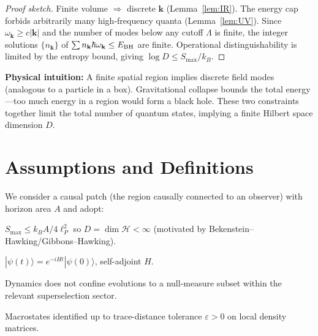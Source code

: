 \documentclass[12pt]{article}
\theoremstyle{remark}
\begin{document}
\begin{proof}[Proof sketch]
Finite volume $\Rightarrow$ discrete $\mathbf{k}$ (Lemma~\ref{lem:IR}). The energy cap forbids arbitrarily many high-frequency quanta (Lemma~\ref{lem:UV}). 
Since $\omega_{\mathbf{k}}\ge c|\mathbf{k}|$ and the number of modes below any cutoff $\Lambda$ is finite, the integer solutions 
$\{n_{\mathbf{k}}\}$ of $\sum n_{\mathbf{k}}\hbar\omega_{\mathbf{k}}\le E_{\rm BH}$ are finite. 
Operational distinguishability is limited by the entropy bound, giving $\log D \le S_{\max}/k_B$.
\end{proof}

\textbf{Physical intuition:} A finite spatial region implies discrete field modes (analogous to a particle in a box). 
Gravitational collapse bounds the total energy---too much energy in a region would form a black hole. 
These two constraints together limit the total number of quantum states, implying a finite Hilbert space dimension $D$.


\section{Assumptions and Definitions}
We consider a causal patch (the region causally connected to an observer) with horizon area $A$ and adopt:
\begin{description}[leftmargin=1.5em,labelsep=0.5em]
  \item[(A1) Finite information bound:] $S_{\max} \leq k_B A/4\ell^2_P$ so $D = \dim \mathcal{H} < \infty$ (motivated by Bekenstein–Hawking/Gibbons–Hawking).
  \item[(A2) Unitary dynamics:] $|\psi(t)\rangle=e^{-iHt}|\psi(0)\rangle$, self-adjoint $H$.
  \item[(A3) Sector mixing (optional):] Dynamics does not confine evolutions to a null-measure subset within the relevant superselection sector.
  \item[(A4) Finite-resolution observers:] Macrostates identified up to trace-distance tolerance $\varepsilon>0$ on local density matrices.
\end{description}
\end{document}
